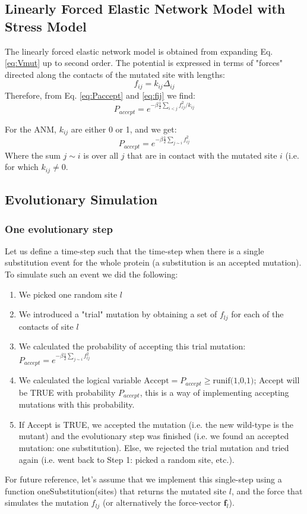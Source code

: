 \documentclass{article}
\begin{document}
\begin{multicols}{2}
{\subsection*{Linearly Forced Elastic Network Model with Stress Model}
The linearly forced elastic network model is obtained from expanding Eq. \ref{eq:Vmut} up to second order. The potential is expressed in terms of "forces" directed along the contacts of the mutated site with lengths:
\begin{equation} \label{eq:fij}
f_{ij} = k_{ij} \Delta_{ij}
\end{equation}
Therefore, from Eq. \ref{eq:Paccept} and \ref{eq:fij} we find:
\begin{equation} \label{eq:PacceptFij}
P_{accept} = e^{-\beta \frac{1}{2} \sum_{i<j}  f_{ij}^2/k_{ij}}
\end{equation}

For the ANM, $k_{ij}$ are either 0 or 1, and we get:
\begin{equation} \label{eq:PacceptANM}
P_{accept} = e^{-\beta \frac{1}{2} \sum_{j\sim i}  f_{ij}^2}
\end{equation}
Where the sum $j \sim i$ is over all $j$ that are in contact with the mutated site $i$ (i.e. for which $k_{ij} \ne 0$.

\subsection*{Evolutionary Simulation}

\subsubsection*{One evolutionary step}
Let us define a time-step such that the time-step when there is a single substitution event for the whole protein (a substitution is an accepted mutation). To simulate such an event we did the following:
\begin{enumerate}
\item We picked one random site $l$
\item We introduced a "trial" mutation by obtaining a set of ${f_{lj}}$ for each of the contacts of site $l$
\item We calculated the probability of accepting this trial mutation: $P_{accept} = e^{-\beta \frac{1}{2} \sum_{j\sim i}  f_{lj}^2}$
\item We calculated the logical variable $\text{Accept} = P_{accept} \ge \text{runif(1,0,1)}$; Accept will be TRUE with probability $P_{accept}$, this is a way of implementing accepting mutations with this probability.
\item If Accept is TRUE, we accepted the mutation (i.e. the new wild-type is the mutant) and the evolutionary step was finished (i.e. we found an accepted mutation: one substitution). Else, we rejected the trial mutation and tried again (i.e. went back to Step 1: picked a random site, etc.).
\end{enumerate}
For future reference, let's assume that we implement this single-step using a function oneSubstitution(sites) that returns the mutated site $l$, and the force that simulates the mutation ${f_{lj}}$ (or alternatively the force-vector $\mathbf{f}_l$). 

}
\end{multicols}
\end{document}
